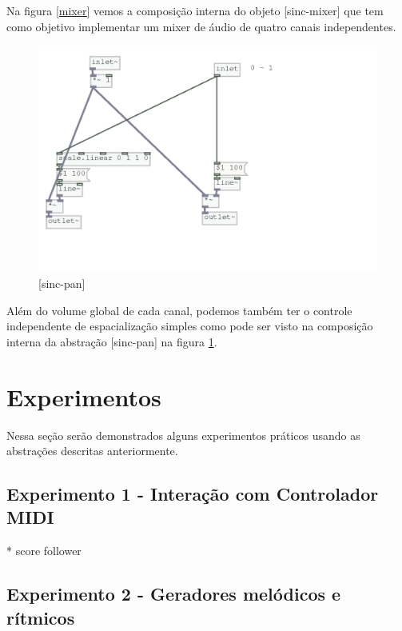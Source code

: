 \documentclass{ppgmus}
\begin{document}
Na figura \ref{mixer} vemos a composição interna do objeto
[sinc-mixer] que tem como objetivo implementar um mixer
de áudio de quatro canais independentes.

\begin{figure}
\includegraphics[scale=.4]{pan}
\caption{[sinc-pan]}
\label{pan}
\end{figure}

Além do volume global de cada canal, podemos também ter o controle
independente de espacialização simples como pode ser visto
na composição interna da abstração [sinc-pan] na figura \ref{pan}.


\section {Experimentos}

Nessa seção serão demonstrados alguns experimentos práticos usando as abstrações
descritas anteriormente.

\subsection{Experimento 1 - Interação com Controlador MIDI}


* score follower


\subsection{Experimento 2 - Geradores melódicos e rítmicos}
\end{document}
